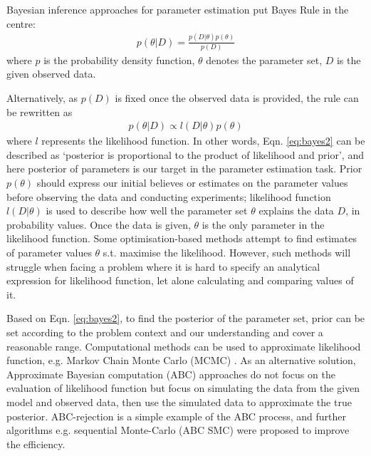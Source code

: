 



Bayesian inference approaches for parameter estimation put Bayes Rule in the centre:
\begin{align}
   \label{eq:bayes}
   p(\theta|D) = \frac{p(D|\theta)p(\theta)}{p(D)}
\end{align}
where $p$ is the probability density function, $\theta$ denotes the parameter set, $D$ is the given observed data.

Alternatively, as $p(D)$ is fixed once the observed data is provided, the rule can be rewritten as 
\begin{align}
   \label{eq:bayes2}
   p(\theta|D) \propto l(D|\theta)p(\theta)
\end{align}
where $l$ represents the likelihood function. In other words, Eqn. \ref{eq:bayes2} can be described as `posterior is proportional to the product of likelihood and prior', and here posterior of parameters is our target in the parameter estimation task. Prior $p(\theta)$ should express our initial believes or estimates on the parameter values before observing the data and conducting experiments; likelihood function $l(D|\theta)$ is used to describe how well the parameter set $\theta$ explains the data $D$, in probability values. Once the data is given, $\theta$ is the only parameter in the likelihood function. Some optimisation-based methods attempt to find estimates of parameter values $\theta$ s.t. maximise the likelihood. However, such methods will struggle when facing a problem where it is hard to specify an analytical expression for likelihood function, let alone calculating and comparing values of it.

Based on Eqn. \ref{eq:bayes2}, to find the posterior of the parameter set, prior can be set according to the problem context and our understanding and cover a reasonable range. Computational methods can be used to approximate likelihood function, e.g. Markov Chain Monte Carlo (MCMC) \cite{ref:MCMC}. As an alternative solution, Approximate Bayesian computation (ABC) approaches do not focus on the evaluation of likelihood function but focus on simulating the data from the given model and observed data, then use the simulated data to approximate the true posterior. ABC-rejection \cite{ABC_rejection} is a simple example of the ABC process, and further algorithms e.g. sequential Monte-Carlo (ABC SMC)\cite{Toni} were proposed to improve the efficiency.

